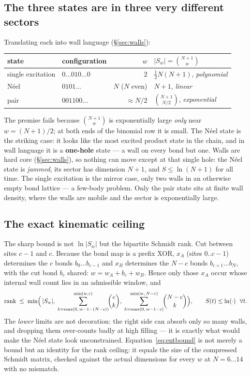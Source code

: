 \documentclass[11pt]{article}
\theoremstyle{plain}
\theoremstyle{definition}
\begin{document}
\subsection{The three states are in three very different sectors}

Translating each into wall language (\S\ref{sec:walls}):
\begin{center}\footnotesize
\begin{tabular}{llrl}
\hline
state & configuration & $w$ & $|S_w| = \binom{N+1}{w}$ \\
\hline
single excitation & $0\ldots010\ldots0$ & $2$ & $\tfrac12 N(N{+}1)$, \emph{polynomial} \\
N\'eel & $0101\ldots$ & $N$ ($N$ even) & $N+1$, \emph{linear} \\
pair & $001100\ldots$ & $\approx N/2$ & $\binom{N+1}{N/2}$, \emph{exponential} \\
\hline
\end{tabular}
\end{center}
The premise fails because $\binom{N+1}{w}$ is exponentially large \emph{only}
near $w=(N{+}1)/2$; at both ends of the binomial row it is small. The N\'eel
state is the striking case: it looks like the most excited product state in the
chain, and in wall language it is a \textbf{one-hole} state --- a wall on every
bond but one. Walls are hard core (\S\ref{sec:walls}), so nothing can move
except at that single hole: the N\'eel state is \emph{jammed}, its sector has
dimension $N+1$, and $S\le\ln(N{+}1)$ for all time. The single excitation is the
mirror case, only two walls in an otherwise empty bond lattice --- a few-body
problem. Only the pair state sits at finite wall density, where the walls are
mobile and the sector is exponentially large.

\subsection{The exact kinematic ceiling}

The sharp bound is not $\ln|S_w|$ but the bipartite Schmidt rank. Cut between
sites $c-1$ and $c$. Because the bond map is a prefix XOR, $x_A$ (sites
$0..c{-}1$) determines the $c$ bonds $b_0\ldots b_{c-1}$ and $x_B$ determines the
$N-c$ bonds $b_{c+1}\ldots b_N$, with the cut bond $b_c$ shared:
$w = w_A + b_c + w_B$. Hence only those $x_A$ occur whose internal wall count
lies in an admissible window, and
\begin{equation}
  \operatorname{rank} \;\le\;
  \min\Bigl(\,|S_w|,\;
  \sum_{k=\max(0,\,w-1-(N-c))}^{\min(w,c)}\!\!\binom{c}{k},\;
  \sum_{k=\max(0,\,w-1-c)}^{\min(w,\,N-c)}\!\!\binom{N-c}{k}\Bigr),
  \qquad S(t)\le\ln(\cdot)\ \ \forall t.
  \label{eq:entbound}
\end{equation}
The \emph{lower} limits are not decoration: the right side can absorb only so
many walls, and dropping them over-counts badly at high filling --- it is exactly
what would make the N\'eel state look unconstrained. Equation~\eqref{eq:entbound}
is not merely a bound but an identity for the rank ceiling: it equals the size of
the compressed Schmidt matrix, checked against the actual dimensions for every
$w$ at $N=6\ldots14$ with no mismatch.
\end{document}
